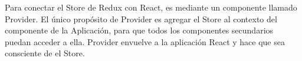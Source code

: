 Para conectar el Store de Redux con React, es mediante un componente llamado Provider. El único propósito de Provider es agregar el Store al contexto del componente de la Aplicación, para que todos los componentes secundarios puedan acceder a ella. Provider envuelve a la aplicación React y hace que sea consciente de el Store. \\[0.8cm]

